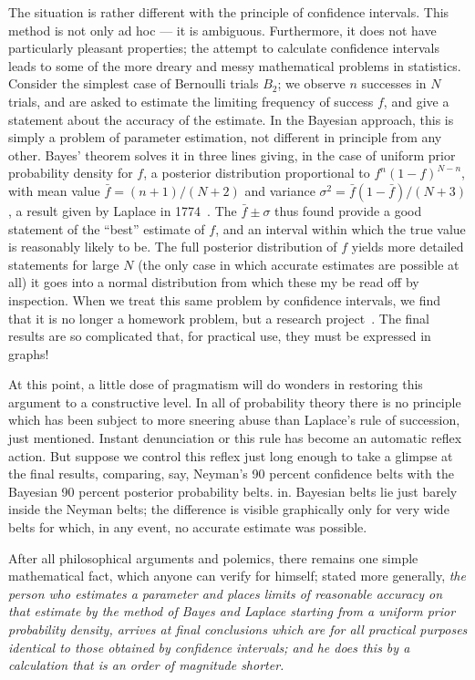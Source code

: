 \documentclass[12pt]{article}
\let\oldcite\cite
\renewcommand{\cite}{~\oldcite}
\begin{document}
The situation is rather different with the principle of confidence
intervals. This method is not only ad hoc --- it is ambiguous. Furthermore,
it does not have particularly pleasant properties; the attempt to calculate
confidence intervals leads to some of the more dreary and messy mathematical
problems in statistics.
Consider the simplest case of Bernoulli trials $B_2$; we observe $n$ successes in $N$ trials, and are asked to estimate the
limiting frequency of success $f$, and give a statement about the accuracy
of the estimate. In the Bayesian approach, this is simply a problem of
parameter estimation, not different in principle from any other. Bayes'
theorem solves it in three lines giving, in the case of uniform prior
probability density for $f$, a posterior distribution proportional to
$f^n (1-f)^{N-n}$, with mean value $\bar f = (n+1)/(N+2)$ and variance $\sigma^2 =\bar f (1-\bar f) / (N+3)$,
a result given by Laplace in 1774\cite{laplace}.
The $\bar f \pm \sigma$ thus found
provide a good statement of the ``best'' estimate of $f$, and an interval
within which the true value is reasonably likely to be. The full posterior
distribution of $f$ yields more detailed statements for large $N$ (the
only case in which accurate estimates are possible at all) it goes into
a normal distribution from which these my be read off by inspection.
When we treat this same problem by confidence intervals, we find that it
is no longer a homework problem, but a research project\cite{pearson}. The final
results are so complicated that, for practical use, they must be expressed
in graphs!

At this point, a little dose of pragmatism will do wonders in
restoring this argument to a constructive level. In all of probability
theory there is no principle which has been subject to more sneering abuse
than Laplace's rule of succession, just mentioned. Instant denunciation
or this rule has become an automatic reflex action. But suppose we control
this reflex just long enough to take a glimpse at the final results,
comparing, say, Neyman's 90 percent confidence belts with the Bayesian
90 percent posterior probability belts. in. Bayesian belts lie just barely
inside the Neyman belts; the difference is visible graphically only for
very wide belts for which, in any event, no accurate estimate was possible.

 After all philosophical arguments and polemics, there remains one simple mathematical fact, which anyone can verify for himself; stated more generally, \emph{the person who estimates a parameter and places limits of reasonable accuracy on that estimate by the method of Bayes and Laplace starting from a uniform prior probability density, arrives at final conclusions which are for all practical purposes identical to those obtained by confidence intervals; and he does this by a calculation that is an order of magnitude shorter.}
\end{document}
